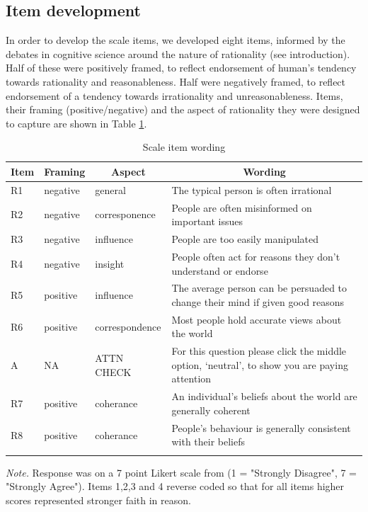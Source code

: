 \documentclass[
  ,jou,floatsintext]{apa6}
\begin{document}
\hypertarget{item-development}{%
\subsection{Item development}\label{item-development}}

In order to develop the scale items, we developed eight items, informed by the debates in cognitive science around the nature of rationality (see introduction). Half of these were positively framed, to reflect endorsement of human's tendency towards rationality and reasonableness. Half were negatively framed, to reflect endorsement of a tendency towards irrationality and unreasonableness. Items, their framing (positive/negative) and the aspect of rationality they were designed to capture are shown in Table \ref{tab:items}.

\begin{table}[tbp]

\begin{center}
\begin{threeparttable}

\caption{\label{tab:items}Scale item wording}

\begin{tabular}{llll}
\toprule
Item & \multicolumn{1}{c}{Framing} & \multicolumn{1}{c}{Aspect} & \multicolumn{1}{c}{Wording}\\
\midrule
R1 & negative & general & The typical person is often irrational\\
R2 & negative & corresponence & People are often misinformed on important issues\\
R3 & negative & influence & People are too easily manipulated\\
R4 & negative & insight & People often act for reasons they don’t understand or endorse\\
R5 & positive & influence & The average person can be persuaded to change their mind if given good reasons\\
R6 & positive & correspondence & Most people hold accurate views about the world\\
A & NA & ATTN CHECK & For this question please click the middle option, ‘neutral’, to show you are paying attention\\
R7 & positive & coherance & An individual's beliefs about the world are generally coherent\\
R8 & positive & coherance & People's behaviour is generally consistent with their beliefs\\
\bottomrule
\addlinespace
\end{tabular}

\begin{tablenotes}[para]
\normalsize{\textit{Note.} Response was on a 7 point Likert scale from (1 = "Strongly Disagree", 7 = "Strongly Agree"). Items 1,2,3 and 4 reverse coded so that for all items higher scores represented stronger faith in reason.}
\end{tablenotes}

\end{threeparttable}
\end{center}

\end{table}
\end{document}
